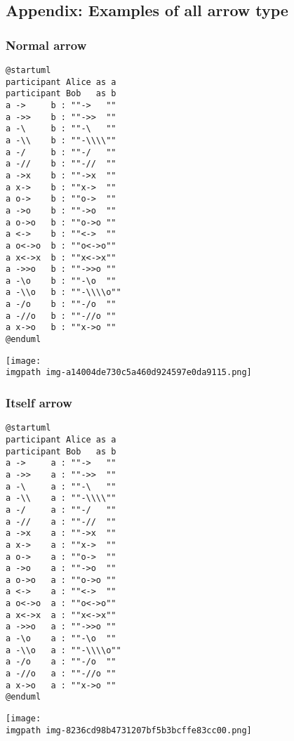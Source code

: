 %
%
\subsection{Appendix: Examples of all arrow type}


\subsubsection{Normal arrow}
\begin{verbatim}
@startuml
participant Alice as a
participant Bob   as b
a ->     b : ""->   ""
a ->>    b : ""->>  ""
a -\     b : ""-\   ""
a -\\    b : ""-\\\\""
a -/     b : ""-/   ""
a -//    b : ""-//  ""
a ->x    b : ""->x  ""
a x->    b : ""x->  ""
a o->    b : ""o->  ""
a ->o    b : ""->o  ""
a o->o   b : ""o->o ""
a <->    b : ""<->  ""
a o<->o  b : ""o<->o""
a x<->x  b : ""x<->x""
a ->>o   b : ""->>o ""
a -\o    b : ""-\o  ""
a -\\o   b : ""-\\\\o""
a -/o    b : ""-/o  ""
a -//o   b : ""-//o ""
a x->o   b : ""x->o ""
@enduml
\end{verbatim}
\begin{center}
\texttt{[image: \\imgpath img-a14004de730c5a460d924597e0da9115.png]}
\end{center}


\subsubsection{Itself arrow}
\begin{verbatim}
@startuml
participant Alice as a
participant Bob   as b
a ->     a : ""->   ""
a ->>    a : ""->>  ""
a -\     a : ""-\   ""
a -\\    a : ""-\\\\""
a -/     a : ""-/   ""
a -//    a : ""-//  ""
a ->x    a : ""->x  ""
a x->    a : ""x->  ""
a o->    a : ""o->  ""
a ->o    a : ""->o  ""
a o->o   a : ""o->o ""
a <->    a : ""<->  ""
a o<->o  a : ""o<->o""
a x<->x  a : ""x<->x""
a ->>o   a : ""->>o ""
a -\o    a : ""-\o  ""
a -\\o   a : ""-\\\\o""
a -/o    a : ""-/o  ""
a -//o   a : ""-//o ""
a x->o   a : ""x->o ""
@enduml
\end{verbatim}
\begin{center}
\texttt{[image: \\imgpath img-8236cd98b4731207bf5b3bcffe83cc00.png]}
\end{center}


